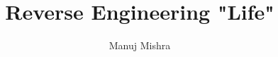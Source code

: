\documentclass[a4paper, twoside, 11pt]{report}
\title{Reverse Engineering "Life"}
\author{Manuj Mishra}
\begin{document}
\renewcommand{\listtheoremname}{List of Definitions}
\renewcommand{\vec}[1]{\underline{\mathbf{#1}}}
\newcommand{\round}[1]{\ensuremath{\lfloor#1\rceil}}



\begin{abstract}

\end{abstract}

\renewcommand{\abstractname}{Acknowledgements}

\begin{abstract}

\end{abstract}

\tableofcontents
\listoffigures
\listoftheorems[ignoreall, show={definition}]
\begingroup
\let\clearpage\relax
\listofalgorithms
\endgroup













\end{document}
